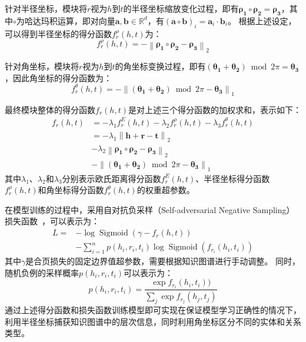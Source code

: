 \documentclass[algorithmlist, AutoFakeBold, AutoFakeSlant, figurelist, tablelist, nomlist, engineering]{seuthesix}
\begin{document}
针对半径坐标，模块将$r$视为$h$到$t$的半径坐标缩放变化过程，即有$\bm{\rho_1} \circ \bm{\rho_2} = \bm{\rho_3}$，其中$\circ$为哈达玛积运算，即对向量$\bm{a}, \bm{b} \in \mathbb{R}^{d}$，有$\left(\mathbf{a} \circ \mathbf{b}\right)_i = \mathbf{a}_i \cdot \mathbf{b}_i$。
根据上述设定，可以得到半径坐标的得分函数$f^{\rho}_r(h, t)$为：
\begin{equation}
  f^{\rho}_r\left(h, t\right) =-\left\|\bm{\rho_1} \circ \bm{\rho_2} - \bm{\rho_3}\right\|_2
\end{equation}

针对角坐标，模块将$r$视为$h$到$t$的角坐标变换过程，即有$(\bm{\theta_1} + \bm{\theta_2}) \bmod 2 \pi = \bm{\theta_3}$，因此角坐标的得分函数为：
\begin{equation}
  f^{\theta}_r\left(h, t\right) =-\left\|\left(\bm{\theta_1}+\bm{\theta_2}\right) \bmod 2 \pi - \bm{\theta_3}\right\|_1
\end{equation}

最终模块整体的得分函数$f_r(h, t)$是对上述三个得分函数的加权求和，表示如下：
\begin{equation}
  \begin{aligned}
    f_r\left(h, t\right) &= -\lambda_1 f^{E}_r(h, t) -\lambda_2 f^{\rho}_r(h, t) -\lambda_3 f^{\theta}_r(h, t) \\
    &= -\lambda_1 \left\|\bm{h} + \bm{r} - \bm{t}\right\|_2 \\
    &-\lambda_2 \left\|\bm{\rho_1} \circ \bm{\rho_2} - \bm{\rho_3}\right\|_2 \\
    &-\left\|\left(\bm{\theta_1}+\bm{\theta_2}\right) \bmod 2 \pi - \bm{\theta_3}\right\|_1
  \end{aligned}
  \label{f_1}
\end{equation}
其中$\lambda_1$、$\lambda_2$和$\lambda_3$分别表示欧氏距离得分函数$f^E_r(h, t)$、半径坐标得分函数$f^{\rho}_r(h, t)$和角坐标得分函数$f^{\theta}_r(h, t)$的权重超参数。

在模型训练的过程中，采用自对抗负采样（Self-adversarial Negative Sampling）损失函数~\cite{sun2018rotate}，可以表示为：
\begin{equation}
  \begin{aligned}
  L= & -\log \operatorname{Sigmoid}\left(\gamma-f_r(h, t)\right) \\
  & -\sum_{i=1}^n p\left(h_i, r_i, t_i\right) \log \operatorname{Sigmoid}(f_{r_i}(h_i, t_i))
  \end{aligned}
  \label{loss_1}
\end{equation}
其中$\gamma$是合页损失的固定边界值超参数，需要根据知识图谱进行手动调整。
同时，随机负例的采样概率$p(h_i, r_i, t_i)$可以表示为：
\begin{equation}
  p(h_i, r_i, t_i)=\frac{\exp f_{r_i}(h_i, t_i))}{\sum_j \exp f_{r_j}(h_j, t_j)}
  \label{abc}
\end{equation}
通过上述得分函数和损失函数训练模型即可实现在保证模型学习正确性的情况下，利用半径坐标捕获知识图谱中的层次信息，同时利用角坐标区分不同的实体和关系类型。
\end{document}
